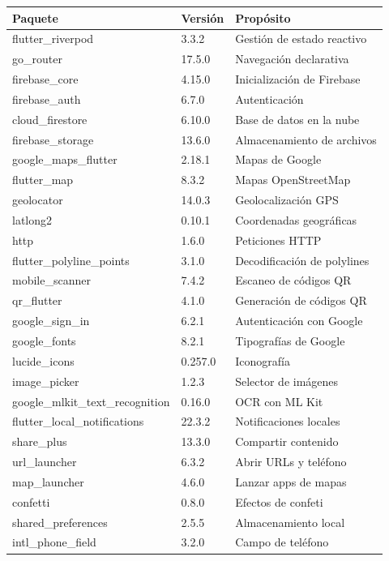 \documentclass[11pt, a4paper, oneside]{report}
\begin{document}
\begin{longtable}{>{\ttfamily}p{5.5cm} p{2cm} p{5.5cm}}
\toprule
\textbf{Paquete} & \textbf{Versión} & \textbf{Propósito} \\
\midrule
flutter\_riverpod & 3.3.2 & Gestión de estado reactivo \\
go\_router & 17.5.0 & Navegación declarativa \\
firebase\_core & 4.15.0 & Inicialización de Firebase \\
firebase\_auth & 6.7.0 & Autenticación \\
cloud\_firestore & 6.10.0 & Base de datos en la nube \\
firebase\_storage & 13.6.0 & Almacenamiento de archivos \\
google\_maps\_flutter & 2.18.1 & Mapas de Google \\
flutter\_map & 8.3.2 & Mapas OpenStreetMap \\
geolocator & 14.0.3 & Geolocalización GPS \\
latlong2 & 0.10.1 & Coordenadas geográficas \\
http & 1.6.0 & Peticiones HTTP \\
flutter\_polyline\_points & 3.1.0 & Decodificación de polylines \\
mobile\_scanner & 7.4.2 & Escaneo de códigos QR \\
qr\_flutter & 4.1.0 & Generación de códigos QR \\
google\_sign\_in & 6.2.1 & Autenticación con Google \\
google\_fonts & 8.2.1 & Tipografías de Google \\
lucide\_icons & 0.257.0 & Iconografía \\
image\_picker & 1.2.3 & Selector de imágenes \\
google\_mlkit\_text\_recognition & 0.16.0 & OCR con ML Kit \\
flutter\_local\_notifications & 22.3.2 & Notificaciones locales \\
share\_plus & 13.3.0 & Compartir contenido \\
url\_launcher & 6.3.2 & Abrir URLs y teléfono \\
map\_launcher & 4.6.0 & Lanzar apps de mapas \\
confetti & 0.8.0 & Efectos de confeti \\
shared\_preferences & 2.5.5 & Almacenamiento local \\
intl\_phone\_field & 3.2.0 & Campo de teléfono \\
\bottomrule
\end{longtable}
\end{document}
